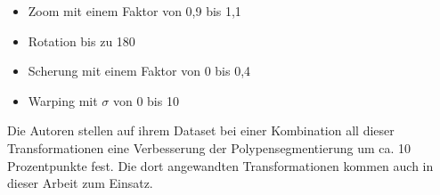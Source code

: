 \begin{itemize}
	\item Zoom mit einem Faktor von 0,9 bis 1,1
	\item Rotation bis zu 180~\textdegree
	\item Scherung mit einem Faktor von 0 bis 0,4
	\item Warping mit $ \sigma $ von 0 bis 10
\end{itemize}

Die Autoren stellen auf ihrem Dataset bei einer Kombination all dieser Transformationen eine Verbesserung der Polypensegmentierung um ca. 10 Prozentpunkte fest.
Die dort angewandten Transformationen kommen auch in dieser Arbeit zum Einsatz.

